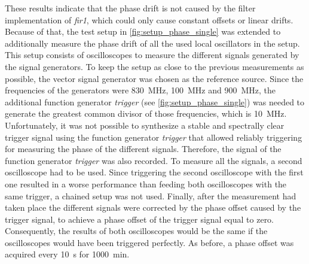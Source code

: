 \documentclass[12pt,a4paper,parskip=full,abstract=true,BCOR=12mm]{scrreprt}
\def\device#1{\mbox{\textit{#1}}}
\begin{document}
These results indicate that the phase drift is not caused by the filter implementation of
\device{fir1}, which could only cause constant offsets or linear drifts. Because of that, the test
setup in \cref{fig:setup_phase_single} was extended to additionally measure the phase drift of all the
used local oscillators in the setup. This setup consists of oscilloscopes to measure
the different signals generated by the signal generators. To keep the setup as close to the previous measurements as possible, the
vector signal generator was chosen as the reference source. Since the frequencies
of the generators were \SI{830}{\mega\hertz}, \SI{100}{\mega\hertz} and \SI{900}{\mega\hertz},
the additional function generator \device{trigger} (see \cref{fig:setup_phase_single}) was needed to
generate the greatest common divisor of those frequencies, which is \SI{10}{\mega\hertz}.
Unfortunately, it was not possible to synthesize a stable and spectrally clear trigger signal using the function generator \device{trigger} that
allowed reliably triggering for measuring the phase of the different signals. Therefore, the signal of the function generator \device{trigger} was also recorded.
To measure all the signals, a second oscilloscope had to be used. Since triggering
the second oscilloscope with the first one resulted in a worse performance than feeding both
oscilloscopes with the same trigger, a chained setup was not used. Finally, after the measurement had taken place the
different signals were corrected by the phase offset caused by the trigger signal, to achieve a phase
offset of the trigger signal equal to zero. Consequently, the results of both oscilloscopes would be the same if the oscilloscopes would
have been triggered perfectly. As before, a phase offset was acquired every \SI{10}{\second}
for \SI{1000}{\minute}.
\end{document}
